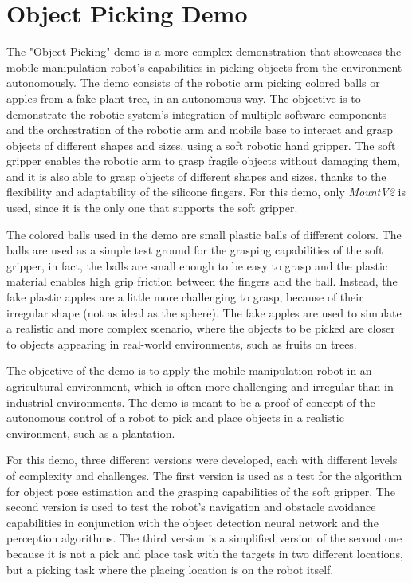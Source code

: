 \section{Object Picking Demo}

The "Object Picking" demo is a more complex demonstration that showcases the mobile manipulation robot's capabilities
in picking objects from the environment autonomously. The demo consists of the robotic arm picking colored balls
or apples from a fake plant tree, in an autonomous way. The objective is to demonstrate the robotic system's integration of
multiple software components and the orchestration of the robotic arm and mobile base to interact and grasp objects of
different shapes and sizes, using a soft robotic hand gripper.
The soft gripper enables the robotic arm to grasp fragile objects without damaging them, and it is also able to
grasp objects of different shapes and sizes, thanks to the flexibility and adaptability of the silicone fingers.
For this demo, only \textit{MountV2} is used, since it is the only one that supports the soft gripper.

The colored balls used in the demo are small plastic balls of different colors. The balls are used as a simple
test ground for the grasping capabilities of the soft gripper, in fact, the balls are small enough to be easy to grasp
and the plastic material enables high grip friction between the fingers and the ball. Instead, the fake plastic apples
are a little more challenging to grasp, because of their irregular shape (not as ideal as the sphere).
The fake apples are used to simulate a realistic and more complex scenario, where the objects to be picked are
closer to objects appearing in real-world environments, such as fruits on trees.

The objective of the demo is to apply the mobile manipulation robot in an agricultural environment, which is
often more challenging and irregular than in industrial environments. The demo is meant to be a proof of concept
of the autonomous control of a robot to pick and place objects in a realistic environment, such as a plantation.

For this demo, three different versions were developed, each with different levels of complexity and challenges.
The first version is used as a test for the algorithm for object pose estimation and the grasping capabilities
of the soft gripper. The second version is used to test the robot's navigation and obstacle avoidance capabilities
in conjunction with the object detection neural network and the perception algorithms. The third version is a 
simplified version of the second one because it is not a pick and place task with the targets in two different
locations, but a picking task where the placing location is on the robot itself.


